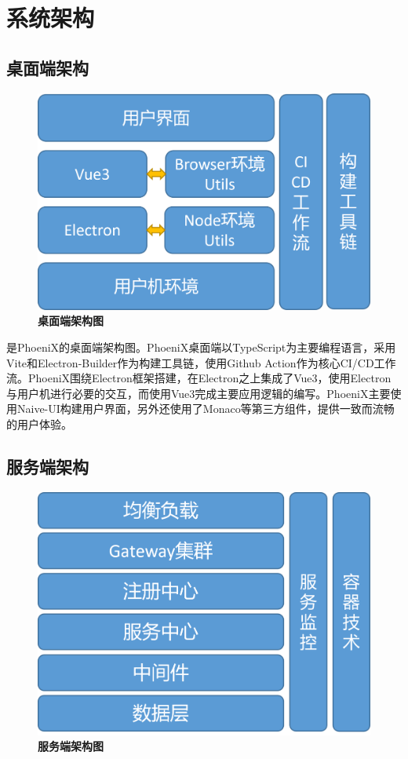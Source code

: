 \chapter{系统架构}

\section{桌面端架构}

\begin{figure}[H]
  \centering
  \includegraphics[scale=0.75]{figure/front_arch.png}
  \caption{\textbf{桌面端架构图}}
  \label{fig:front_arch}
\end{figure}

是PhoeniX的桌面端架构图。PhoeniX桌面端以TypeScript为主要编程语言，采用Vite和Electron-Builder作为构建工具链，使用Github Action作为核心CI/CD工作流。PhoeniX围绕Electron框架搭建，在Electron之上集成了Vue3，使用Electron与用户机进行必要的交互，而使用Vue3完成主要应用逻辑的编写。PhoeniX主要使用Naive-UI构建用户界面，另外还使用了Monaco等第三方组件，提供一致而流畅的用户体验。

\section{服务端架构}

\begin{figure}[H]
  \centering
  \includegraphics[scale=0.75]{figure/back_arch.png}
  \caption{\textbf{服务端架构图}}
  \label{fig:back_arch}
\end{figure}

